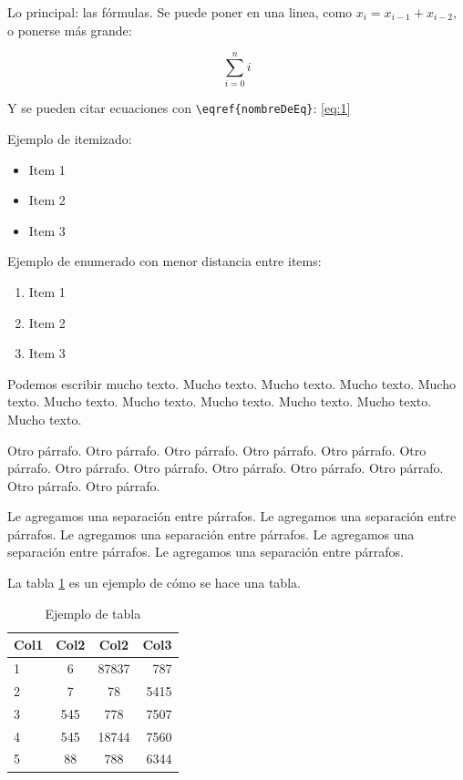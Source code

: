 \documentclass[10pt,a4paper]{article}
\begin{document}
		



Lo principal: las fórmulas. Se puede poner en una linea, como $x_i = x_{i-1} + x_{i-2}$, o ponerse más grande:

\begin{equation}
	\sum\limits_{i=0}^{n} i
	\label{eq:1}
\end{equation}

Y se pueden citar ecuaciones con \verb|\eqref{nombreDeEq}|: \eqref{eq:1}

Ejemplo de itemizado:

\begin{itemize}
	\item Item 1
	\item Item 2
	\item Item 3
\end{itemize}

Ejemplo de enumerado con menor distancia entre items:

\begin{enumerate} \setlength\itemsep{0cm}
	\item Item 1
	\item Item 2
	\item Item 3
\end{enumerate}

Podemos escribir mucho texto. Mucho texto. Mucho texto. Mucho texto. Mucho texto. Mucho texto. Mucho texto. Mucho texto. Mucho texto. Mucho texto. Mucho texto.

Otro párrafo. Otro párrafo. Otro párrafo. Otro párrafo. Otro párrafo. Otro párrafo. Otro párrafo. Otro párrafo. Otro párrafo. Otro párrafo. Otro párrafo. Otro párrafo. Otro párrafo.

\vspace{0.3cm}

Le agregamos una separación entre párrafos. Le agregamos una separación entre párrafos. Le agregamos una separación entre párrafos. Le agregamos una separación entre párrafos. Le agregamos una separación entre párrafos.

\vspace{0.3cm}

La tabla \ref{tab:ejemplo} es un ejemplo de cómo se hace una tabla.

\begin{table}[h!]
	\centering
	\begin{tabular}{||l c c r||} 
		\hline
		Col1 & Col2 & Col2 & Col3 \\ [0.5ex] 
		\hline\hline
		1 & 6 & 87837 & 787 \\ 
		2 & 7 & 78 & 5415 \\
		3 & 545 & 778 & 7507 \\
		4 & 545 & 18744 & 7560 \\
		5 & 88 & 788 & 6344 \\
		\hline
	\end{tabular}
	\caption{Ejemplo de tabla}
	\label{tab:ejemplo}
\end{table}
\end{document}
